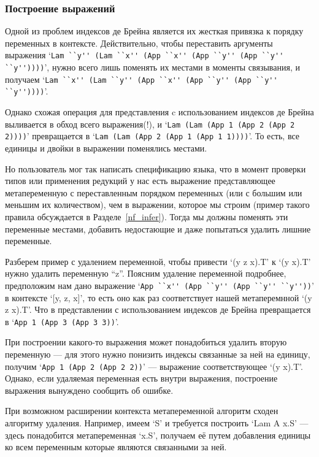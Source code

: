 \subsubsection{Построение выражений}\label{build_exp}
Одной из проблем индексов де Брейна является их жесткая привязка к порядку переменных в контексте. Действительно, чтобы переставить аргументы выражения `\lstinline{Lam ``y'' (Lam ``x'' (App ``x'' (App ``y'' (App ``y'' ``y''))))}', нужно всего лишь поменять их местами в моменты связывания, и получаем `\lstinline{Lam ``x'' (Lam ``y'' (App ``x'' (App ``y'' (App ``y'' ``y''))))}'.

Однако схожая операция для представления c использованием индексов де Брейна выливается в обход всего выражения(!), и `\lstinline{Lam (Lam (App 1 (App 2 (App 2 2))))}' превращается в `\lstinline{Lam (Lam (App 2 (App 1 (App 1 1))))}'. То есть, все единицы и двойки в выражении поменялись местами.

Но пользователь мог так написать спецификацию языка, что в момент проверки типов или применения редукций у нас есть выражение представляющее метапеременную с переставленным порядком переменных (или с большим или меньшим их количеством), чем в выражении, которое мы строим (пример такого правила обсуждается в Разделе~\ref{nf_infer}). Тогда мы должны поменять эти переменные местами, добавить недостающие и даже попытаться удалить лишние переменные.

Разберем пример с удалением переменной, чтобы привести `(y z x).T' к `(y x).T' нужно удалить переменную ``z''. Поясним удаление переменной подробнее, предположим нам дано выражение `\lstinline{App ``x'' (App ``y'' (App ``y'' ``y''))}' в контексте `[y, z, x]', то есть оно как раз соответствует нашей метаперемнной `(y z x).T'. Что в представлении с использованием индексов де Брейна превращается в `\lstinline{App 1 (App 3 (App 3 3))}'.

При построении какого-то выражения может понадобиться удалить вторую переменную --- для этого нужно понизить индексы связанные за ней на единицу, получим `\lstinline{App 1 (App 2 (App 2 2))}' --- выражение соответствующее `(y x).T'. Однако, если удаляемая переменная есть внутри выражения, построение выражения вынуждено сообщить об ошибке.

При возможном расширении контекста метапеременной алгоритм сходен алгоритму удаления. Например, имеем `S' и требуется построить `Lam A x.S' --- здесь понадобится метапеременная `x.S', получаем её путем добавления единицы ко всем переменным которые являются связанными за ней.

